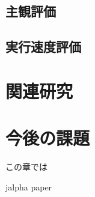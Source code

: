 \documentclass[a4j,12pt]{jreport}
\begin{document}
\section{主観評価}
\section{実行速度評価}
 
 
\chapter{関連研究}


\chapter{今後の課題}
この章では


 {jalpha}
 {paper}
\end{document}
